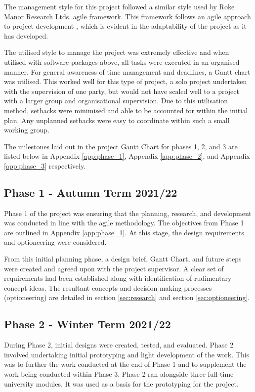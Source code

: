\documentclass [11pt]{article}
\begin{document}
The management style for this project followed a similar style used by Roke Manor Research Ltds. agile framework. This framework follows an agile approach to project development \cite{agile_development}, which is evident in the adaptability of the project as it has developed.  

The utilised style to manage the project was extremely effective and when utilised with software packages above, all tasks were executed in an organised manner. For general awareness of time management and deadlines, a Gantt chart was utilised. This worked well for this type of project, a solo project undertaken with the supervision of one party, but would not have scaled well to a project with a larger group and organisational supervision. Due to this utilisation method, setbacks were minimised and able to be accounted for within the initial plan. Any unplanned setbacks were easy to coordinate within such a small working group. 

The milestones laid out in the project Gantt Chart for phases 1, 2, and 3 are listed below in Appendix \ref{app:phase_1}, Appendix \ref{app:phase_2}, and Appendix \ref{app:phase_3} respectively.

\subsection{Phase 1 - Autumn Term 2021/22}\label{sec:phase_1}

Phase 1 of the project was ensuring that the planning, research, and development was conducted in line with the agile methodology. The objectives from Phase 1 are outlined in Appendix \ref{app:phase_1}. At this stage, the design requirements and optioneering were considered.  

From this initial planning phase, a design brief, Gantt Chart, and future steps were created and agreed upon with the project supervisor. A clear set of requirements had been established along with identification of rudimentary concept ideas. The resultant concepts and decision making processes (optioneering) are detailed in section \ref{sec:research} and section \ref{sec:optioneering}.  

\subsection{Phase 2 - Winter Term 2021/22}\label{sec:phase_2}

During Phase 2, initial designs were created, tested, and evaluated. Phase 2 involved undertaking initial prototyping and light development of the work. This was to further the work conducted at the end of Phase 1 and to supplement the work being conducted within Phase 3. Phase 2 ran alongside three full-time university modules. It was used as a basis for the prototyping for the project.  
\end{document}
